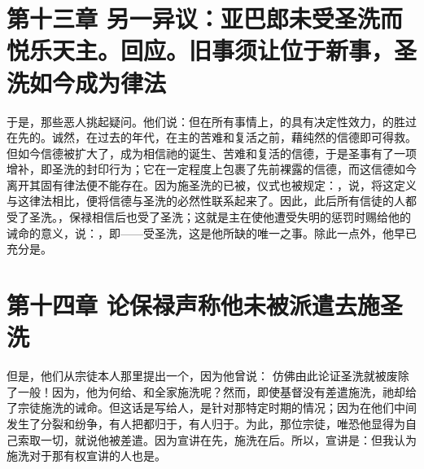 
\section{第十三章 另一异议：亚巴郎未受圣洗而悦乐天主。回应。旧事须让位于新事，圣洗如今成为律法}

于是，那些恶人挑起疑问。他们说：但在所有事情上，的具有决定性效力，的胜过在先的。诚然，在过去的年代，在主的苦难和复活之前，藉纯然的信德即可得救。但如今信德被扩大了，成为相信祂的诞生、苦难和复活的信德，于是圣事有了一项增补，即圣洗的封印行为；它在一定程度上包裹了先前裸露的信德，而这信德如今离开其固有律法便不能存在。因为施圣洗的已被，仪式也被规定：，说，将这定义与这律法相比，便将信德与圣洗的必然性联系起来了。因此，此后所有信徒的人都受了圣洗。，保禄相信后也受了圣洗；这就是主在使他遭受失明的惩罚时赐给他的诫命的意义，说：，即——受圣洗，这是他所缺的唯一之事。除此一点外，他早已充分是。\par


\section{第十四章 论保禄声称他未被派遣去施圣洗}

但是，他们从宗徒本人那里提出一个，因为他曾说： 仿佛由此论证圣洗就被废除了一般！因为，他为何给、和全家施洗呢？然而，即使基督没有差遣施洗，祂却给了宗徒施洗的诫命。但这话是写给人，是针对那特定时期的情况；因为在他们中间发生了分裂和纷争，有人把都归于，有人归于。为此，那位宗徒，唯恐他显得为自己索取一切，就说他被差遣。因为宣讲在先，施洗在后。所以，宣讲是：但我认为施洗对于那有权宣讲的人也是。\par

